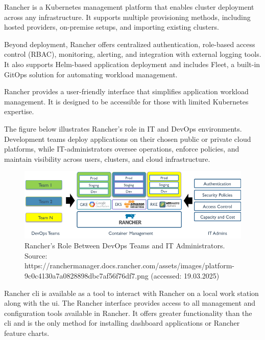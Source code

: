 \documentclass[../main.tex]{subfiles}
\begin{document}
Rancher is a Kubernetes management platform that enables cluster deployment across any infrastructure. It supports multiple provisioning methods, including hosted providers, on-premise setups, and importing existing clusters. 

Beyond deployment, Rancher offers centralized authentication, role-based access control (RBAC), monitoring, alerting, and integration with external logging tools. It also supports Helm-based application deployment and includes Fleet, a built-in GitOps solution for automating workload management. \cite{rancher}

Rancher provides a user-friendly interface that simplifies application workload management. It is designed to be accessible for those with limited Kubernetes expertise.

The figure below illustrates Rancher’s role in IT and DevOps environments. Development teams deploy applications on their chosen public or private cloud platforms, while IT-administrators oversee operations, enforce policies, and maintain visibility across users, clusters, and cloud infrastructure.

\begin{figure}[H]
    \centering
    \includegraphics[scale=0.5]{img/2-background/rancher/rancher_devops_teams.png}
    \caption{Rancher’s Role Between DevOps Teams and IT Administrators. 
    Source: https://ranchermanager.docs.rancher.com/assets/images/platform-9c0c4130a7a0828898dbc7af56f76df7.png (accessed: 19.03.2025)}
    \label{fig:rancher_devops_teams}
\end{figure}

Rancher \gls{cli} is available as a tool to interact with Rancher on a local work station along with the \gls{ui}. The Rancher interface provides access to all management and configuration tools available in Rancher. It offers greater functionality than the \gls{cli} and is the only method for installing dashboard applications or Rancher feature charts.
\end{document}
